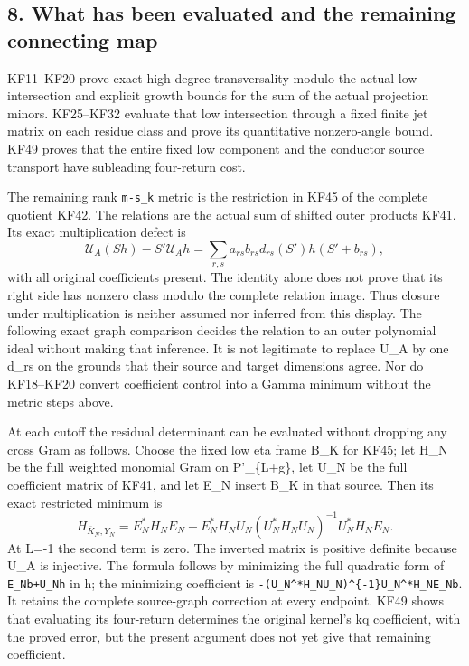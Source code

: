 \documentclass[11pt]{article}
\begin{document}
\subsection{8. What has been evaluated and the remaining connecting map}\label{what-has-been-evaluated-and-the-remaining-connecting-map}

KF11--KF20 prove exact high-degree transversality modulo the actual low intersection and explicit growth bounds for the sum of the actual projection minors. KF25--KF32 evaluate that low intersection through a fixed finite jet matrix on each residue class and prove its quantitative nonzero-angle bound. KF49 proves that the entire fixed low component and the conductor source transport have subleading four-return cost.

The remaining rank \texttt{m-s\_k} metric is the restriction in KF45 of the complete quotient KF42. The relations are the actual sum of shifted outer products KF41. Its exact multiplication defect is \[
\mathcal U_A(Sh)-S'\mathcal U_Ah
=\sum_{r,s}a_{rs}b_{rs}d_{rs}(S')h(S'+b_{rs}),
\tag{KF50}
\] with all original coefficients present. The identity alone does not prove that its right side has nonzero class modulo the complete relation image. Thus closure under multiplication is neither assumed nor inferred from this display. The following exact graph comparison decides the relation to an outer polynomial ideal without making that inference. It is not legitimate to replace U\_A by one d\_rs on the grounds that their source and target dimensions agree. Nor do KF18--KF20 convert coefficient control into a Gamma minimum without the metric steps above.

At each cutoff the residual determinant can be evaluated without dropping any cross Gram as follows. Choose the fixed low eta frame B\_K for KF45; let H\_N be the full weighted monomial Gram on P'\_\{L+g\}, let U\_N be the full coefficient matrix of KF41, and let E\_N insert B\_K in that source. Then its exact restricted minimum is \[
\boxed{H_{\overline K_N,Y_N}=
E_N^*H_NE_N-E_N^*H_NU_N(U_N^*H_NU_N)^{-1}U_N^*H_NE_N.}
\tag{KF51}
\] At L=-1 the second term is zero. The inverted matrix is positive definite because U\_A is injective. The formula follows by minimizing the full quadratic form of \texttt{E\_Nb+U\_Nh} in h; the minimizing coefficient is \nolinkurl{-(U_N^*H_NU_N)^{-1}U_N^*H_NE_Nb}. It retains the complete source-graph correction at every endpoint. KF49 shows that evaluating its four-return determines the original kernel's kq coefficient, with the proved error, but the present argument does not yet give that remaining coefficient.
\end{document}
